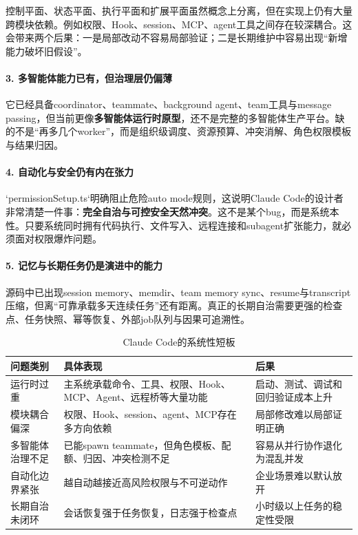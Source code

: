 \documentclass[12pt,a4paper]{article}
\begin{document}
控制平面、状态平面、执行平面和扩展平面虽然概念上分离，但在实现上仍有大量跨模块依赖。例如权限、Hook、session、MCP、agent工具之间存在较深耦合。这会带来两个后果：一是局部改动不容易局部验证；二是长期维护中容易出现“新增能力破坏旧假设”。

\paragraph{3. 多智能体能力已有，但治理层仍偏薄}

它已经具备coordinator、teammate、background agent、team工具与message passing，但当前更像\textbf{多智能体运行时原型}，还不是完整的多智能体生产平台。缺的不是“再多几个worker”，而是组织级调度、资源预算、冲突消解、角色权限模板与结果归因。

\paragraph{4. 自动化与安全仍有内在张力}

`permissionSetup.ts`明确阻止危险auto mode规则，这说明Claude Code的设计者非常清楚一件事：\textbf{完全自治与可控安全天然冲突}。这不是某个bug，而是系统本性。只要系统同时拥有代码执行、文件写入、远程连接和subagent扩张能力，就必须面对权限爆炸问题。

\paragraph{5. 记忆与长期任务仍是演进中的能力}

源码中已出现session memory、memdir、team memory sync、resume与transcript压缩，但离“可靠承载多天连续任务”还有距离。真正的长期自治需要更强的检查点、任务快照、幂等恢复、外部job队列与因果可追溯性。

\begin{table}[H]
\centering
\caption{Claude Code的系统性短板}
\begin{tabular}{p{3.0cm}p{4.4cm}p{4.8cm}}
\toprule
\textbf{问题类别} & \textbf{具体表现} & \textbf{后果} \\
\midrule
运行时过重 & 主系统承载命令、工具、权限、Hook、MCP、Agent、远程桥等大量功能 & 启动、测试、调试和回归验证成本上升 \\
模块耦合偏深 & 权限、Hook、session、agent、MCP存在多方向依赖 & 局部修改难以局部证明正确 \\
多智能体治理不足 & 已能spawn teammate，但角色模板、配额、归因、冲突检测不足 & 容易从并行协作退化为混乱并发 \\
自动化边界紧张 & 越自动越接近高风险权限与不可逆动作 & 企业场景难以默认放开 \\
长期自治未闭环 & 会话恢复强于任务恢复，日志强于检查点 & 小时级以上任务的稳定性受限 \\
\bottomrule
\end{tabular}
\end{table}
\end{document}
